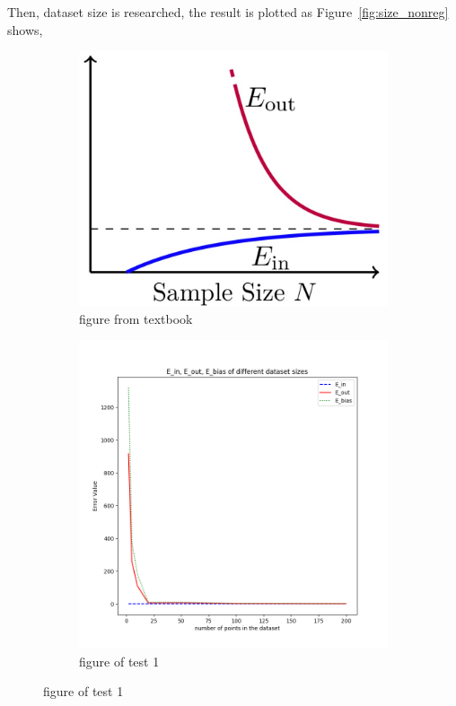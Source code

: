 \documentclass[12pt,letterpaper]{article}
\begin{document}
Then, dataset size is researched, the result is plotted as Figure~\ref{fig:size_nonreg} shows,
\begin{figure}[h]
\centering
\begin{subfigure}{.45\textwidth}
  \centering
  \includegraphics[width=.9\linewidth]{sample_txtbook.jpg}
  \caption{\small figure from textbook}
  \label{fig:sub1}
\end{subfigure}%
\begin{subfigure}{.45\textwidth}
  \centering
  \includegraphics[width=.9\linewidth]{test_N_noreg.png}
  \caption{\small figure of test 1}

\end{subfigure}
\end{figure}
\end{document}
